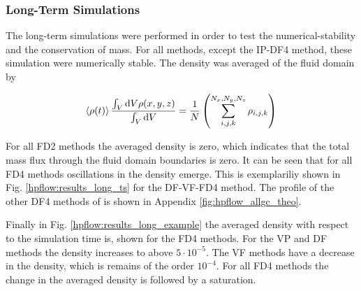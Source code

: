 \subsubsection{Long-Term Simulations}

The long-term simulations were performed in order to test the numerical-stability and the conservation of mass.
For all methods, except the IP-DF4 method, these simulation were numerically stable.
The density was averaged of the fluid domain by

\begin{align}
    \left<\rho(t)\right> \frac{\int_V \mathop{}\!\mathrm{d} V \rho(x,y,z)}{\int_V \mathop{}\!\mathrm{d} V} =
    \frac{1}{N}\left(\sum_{i,j,k}^{N_x, N_y, N_z} \rho_{i,j,k}\right)
\end{align}


For all FD2 methods the averaged density is zero, which indicates that the total mass flux through the
fluid domain boundaries is zero.
It can be seen that for all FD4 methods oscillations in the density emerge.
This is exemplariliy shown in Fig.  \ref{hpflow:results_long_ts} for the DF-VF-FD4 method.
The profile of the other DF4 methods of is shown in Appendix \ref{fig:hpflow_allgc_theo}.

Finally in Fig. \ref{hpflow:results_long_example} the averaged density with respect to the simulation time is, shown for the
FD4 methods.  For the VP and DF methods the density increases to above $5\cdot10^{-5}$.
The VF methods have a decrease in the density, which is remains of the order $10^{-4}$.
For all FD4 methods the change in the averaged density is followed by a saturation.

